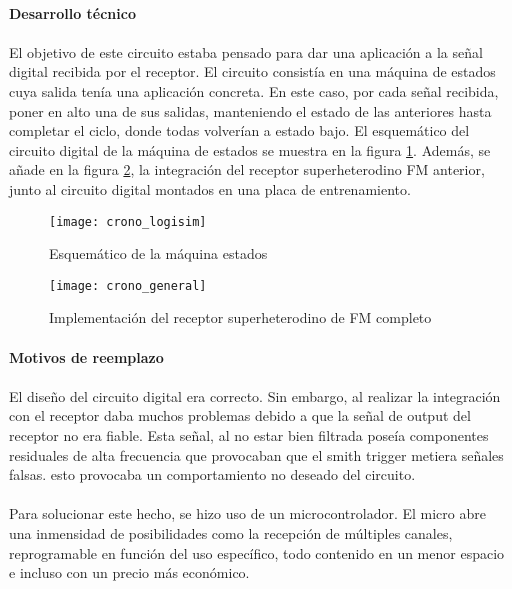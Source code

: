 \paragraph{Desarrollo técnico}
\paragraph{}
El objetivo de este circuito estaba pensado para dar una aplicaci\'on a la señal digital recibida por el receptor. El circuito consistía en una máquina de estados cuya salida tenía una aplicación concreta. En este caso, por cada señal recibida, poner en alto una de sus salidas, manteniendo el estado de las anteriores hasta completar el ciclo, donde todas volverían a estado bajo. 
El esquemático del circuito digital de la máquina de estados se muestra en la figura \ref{fig:crono_logisim}.
Además, se añade en la figura \ref{fig:crono_general}, la integración del receptor superheterodino FM anterior, junto al circuito digital montados en una placa de entrenamiento.

\begin{figure}[h!]
    \centering
    \texttt{[image: crono\_logisim]}
    \caption{Esquemático de la m\'aquina estados}
    \label{fig:crono_logisim}
\end{figure}

\begin{figure}[h!]
    \centering
    \texttt{[image: crono\_general]}
    \caption{Implementaci\'on del receptor superheterodino de FM completo}
    \label{fig:crono_general}
\end{figure}

\paragraph{Motivos de reemplazo}
\paragraph{}
El diseño del circuito digital era correcto. Sin embargo, al realizar la integración con el receptor daba muchos problemas debido a que la señal de output del receptor no era fiable. Esta señal, al no estar bien filtrada poseía componentes residuales de alta frecuencia que provocaban que el smith trigger metiera señales falsas. esto provocaba un comportamiento no deseado del circuito. 
\paragraph{}
Para solucionar este hecho, se hizo uso de un microcontrolador. El micro abre una inmensidad de posibilidades como la recepci\'on de múltiples canales, reprogramable en función del uso específico, todo contenido en un menor espacio e incluso con un precio más económico.
